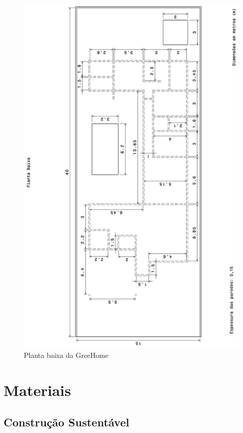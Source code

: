 \begin{figure}[H]
  \begin{center}
	\includegraphics[keepaspectratio,scale=0.4,angle=270]{figuras/planta_baixa.eps}
	\caption{Planta baixa da GreeHome}
  \end{center}
\end{figure}

\section{Materiais}

\subsection{Construção Sustentável}
	
